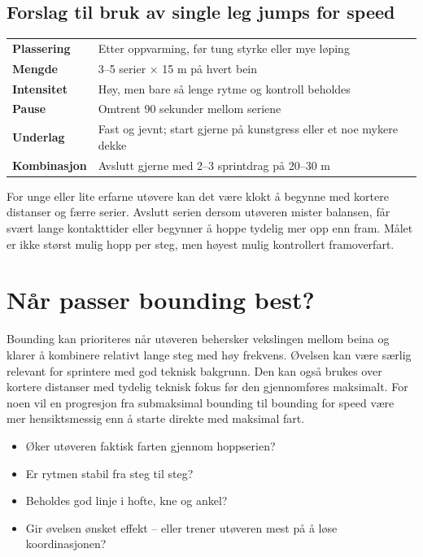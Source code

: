 \subsection{Forslag til bruk av single leg jumps for speed}\label{forslag-til-bruk-av-single-leg-jumps-for-speed}

\begin{table}[t]
\centering\sffamily\footnotesize\setlength{\tabcolsep}{3.5pt}\renewcommand{\arraystretch}{1.25}
\begin{tabular}{@{}>{\bfseries}p{19mm}p{60mm}@{}}
\toprule
Plassering & Etter oppvarming, før tung styrke eller mye løping\\
Mengde & 3–5 serier × 15 m på hvert bein\\
Intensitet & Høy, men bare så lenge rytme og kontroll beholdes\\
Pause & Omtrent 90 sekunder mellom seriene\\
Underlag & Fast og jevnt; start gjerne på kunstgress eller et noe mykere dekke\\
Kombinasjon & Avslutt gjerne med 2–3 sprintdrag på 20–30 m\\
\bottomrule
\end{tabular}
\end{table}

For unge eller lite erfarne utøvere kan det være klokt å begynne med kortere distanser og færre serier. Avslutt serien dersom utøveren mister balansen, får svært lange kontakttider eller begynner å hoppe tydelig mer opp enn fram. Målet er ikke størst mulig hopp per steg, men høyest mulig kontrollert framoverfart.

\section{Når passer bounding best?}\label{nuxe5r-passer-bounding-best}

Bounding kan prioriteres når utøveren behersker vekslingen mellom beina og klarer å kombinere relativt lange steg med høy frekvens. Øvelsen kan være særlig relevant for sprintere med god teknisk bakgrunn. Den kan også brukes over kortere distanser med tydelig teknisk fokus før den gjennomføres maksimalt. For noen vil en progresjon fra submaksimal bounding til bounding for speed være mer hensiktsmessig enn å starte direkte med maksimal fart.

\begin{tcolorbox}[fagboks,title={\MakeUppercase{Trenerens sjekkliste}}]

\begin{itemize}
\tightlist
\item
  Øker utøveren faktisk farten gjennom hoppserien?
\item
  Er rytmen stabil fra steg til steg?
\item
  Beholdes god linje i hofte, kne og ankel?
\item
  Gir øvelsen ønsket effekt -- eller trener utøveren mest på å løse koordinasjonen?
\end{itemize}

\end{tcolorbox}


